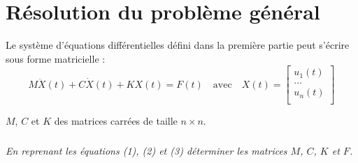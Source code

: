 \documentclass[10pt]{article}
\newif\ifprof
\begin{document}
\section{Résolution du problème général}
Le système d'équations différentielles défini dans la première partie peut s'écrire sous forme matricielle :
$$
M \ddot{X}(t) +C \dot{X}(t) +K {X}(t) = F(t) \quad \text{avec} \quad 
X(t)=\left[
\begin{array}{c} 
u_1(t) \\ 
... \\ 
u_n(t) \\
\end{array}\right]
$$

$M$, $C$ et $K$ des matrices carrées de taille $n\times n$.


\subparagraph{}
\textit{En reprenant les équations (1), (2) et (3) déterminer les matrices $M$, $C$, $K$ et $F$.}
\ifprof
\begin{corrige}
\footnotesize{
$$
M =
\begin{pmatrix}
m  &  0 & 0 \\
0  & \ddots &0 \\
0 & 0 &  m \\
 \end{pmatrix}
 \quad
C =
\begin{pmatrix}
2c  & -c &  0 & \cdots & \cdots & \cdots  & 0 \\
-c  & 2c & -c & \ddots &  & 0& \vdots\\
0 & -c  & 2c & \ddots & \ddots &  & \vdots\\
\vdots & \ddots &\ddots & \ddots & \ddots & \ddots & \vdots\\
\vdots &  & \ddots &\ddots& 2c & -c & 0 \\
\vdots & 0 &  & \ddots & -c & 2c & -c\\
0 & \cdots & \cdots & \cdots & 0 & -c & 2c\\
 \end{pmatrix}
 \quad
K =
\begin{pmatrix}
2k  & -k &  0 & \cdots & \cdots & \cdots  & 0 \\
-k & 2k & -k & \ddots &  & 0& \vdots\\
0 & -k  & 2k & \ddots & \ddots &  & \vdots\\
\vdots & \ddots &\ddots & \ddots & \ddots & \ddots & \vdots\\
\vdots &  & \ddots &\ddots& 2k & -k & 0 \\
\vdots & 0 &  & \ddots & -k & 2k & -k\\
0 & \cdots & \cdots & \cdots & 0 & -k & 2k\\
 \end{pmatrix}
 \quad
 F =
 \begin{pmatrix}
 0 \\
 \vdots \\
 0 \\
 f_n(t) 
 \end{pmatrix}
$$}
\end{corrige}
\else
\fi
\end{document}
